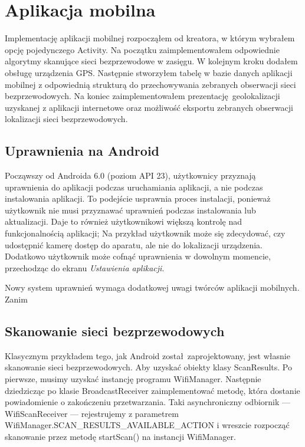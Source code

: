 
\section{Aplikacja mobilna}
Implementację aplikacji mobilnej rozpocząłem od kreatora, w którym wybrałem opcję pojedynczego Activity. Na początku zaimplementowałem odpowiednie algorytmy skanujące sieci bezprzewodowe w zasięgu. W kolejnym kroku dodałem obsługę urządzenia GPS. Następnie stworzyłem tabelę w bazie danych aplikacji mobilnej z odpowiednią strukturą do przechowywania zebranych obserwacji sieci bezprzewodowych. Na koniec zaimplementowałem prezentację geolokalizacji uzyskanej z aplikacji internetowe oraz możliwość eksportu zebranych obserwacji lokalizacji sieci bezprzewodowych.

\subsection{Uprawnienia na Android}

Począwszy od Androida 6.0 (poziom API 23), użytkownicy przyznają uprawnienia do aplikacji podczas uruchamiania aplikacji, a nie podczas instalowania aplikacji. To podejście usprawnia proces instalacji, ponieważ użytkownik nie musi przyznawać uprawnień podczas instalowania lub aktualizacji. Daje to również użytkownikowi większą kontrolę nad funkcjonalnością aplikacji; Na przykład użytkownik może się zdecydować, czy udostępnić kamerę dostęp do aparatu, ale nie do lokalizacji urządzenia. Dodatkowo użytkownik może cofnąć uprawnienia w dowolnym momencie, przechodząc do ekranu \textit{Ustawienia aplikacji}.\cite{NewPermissionsModelInAndroid60}

Nowy system uprawnień wymaga dodatkowej uwagi twórców aplikacji mobilnych. Zanim

\subsection{Skanowanie sieci bezprzewodowych}
Klasycznym przykładem tego, jak Android został zaprojektowany, jest własnie skanowanie sieci bezprzewodowych. Aby uzyskać obiekty klasy ScanResults. Po pierwsze, musimy uzyskać instancję programu WifiManager. Następnie dziedzicząc po klasie BroadcastReceiver zaimplementować metodę, która dostanie powiadomienie o zakończeniu przetwarzania. Taki asynchroniczny odbiornik — WifiScanReceiver — rejestrujemy z parametrem WifiManager.SCAN_RESULTS_AVAILABLE_ACTION i wreszcie rozpocząć skanowanie przez metodę startScan() na instancji WifiManager.

